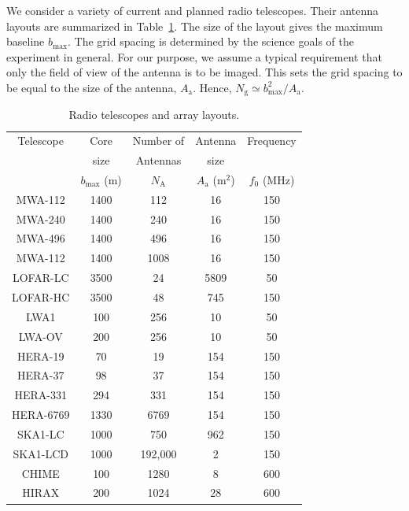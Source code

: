 \documentclass[a4paper,fleqn,usenatbib]{mnras}
\newcommand{\Nant}{N_\textrm{A}}
\newcommand{\Ngrid}{N_\textrm{g}}
\begin{document}
We consider a variety of current and planned radio telescopes. Their antenna layouts are summarized in Table~\ref{tab:antenna-layouts}. The size of the layout gives the maximum baseline $b_\textrm{max}$. The grid spacing is determined by the science goals of the experiment in general. For our purpose, we assume a typical requirement that only the field of view of the antenna is to be imaged. This sets the grid spacing to be equal to the size of the antenna, $A_\textrm{a}$. Hence, $\Ngrid\simeq b_\textrm{max}^2/A_\textrm{a}$. 

\begin{table}
  \scriptsize
  \centering
  \caption{Radio telescopes and array layouts.}
  \label{tab:antenna-layouts}
  \begin{threeparttable}
  \begin{tabular}{ccccc} 
    \hline
    Telescope & Core & Number of & Antenna & Frequency \\
              & size & Antennas & size & \\
              & $b_\textrm{max}$ (m) & $\Nant$ & $A_\textrm{a}$ (m$^2$) & $f_0$ (MHz) \\
    \hline
    MWA-112\tnote{a} & 1400 & 112 & 16 & 150 \\
    MWA-240\tnote{a} & 1400 & 240 & 16 & 150 \\
    MWA-496\tnote{a} & 1400 & 496 & 16 & 150 \\
    MWA-112\tnote{a} & 1400 & 1008 & 16 & 150 \\
    LOFAR-LC\tnote{b} & 3500 & 24 & 5809 & 50 \\
    LOFAR-HC\tnote{b} & 3500 & 48 & 745 & 150 \\
    LWA1 & 100 & 256 & 10 & 50 \\
    LWA-OV\tnote{c} & 200 & 256 & 10 & 50 \\
    HERA-19 & 70 & 19 & 154 & 150 \\
    HERA-37 & 98 & 37 & 154 & 150 \\
    HERA-331 & 294 & 331 & 154 & 150 \\
    HERA-6769\tnote{d} & 1330 & 6769 & 154 & 150 \\
    SKA1-LC\tnote{e} & 1000 & 750 & 962 & 150 \\
    SKA1-LCD\tnote{f} & 1000 & 192,000 & 2 & 150 \\
    CHIME & 100 & 1280 & 8 & 600 \\
    HIRAX\tnote{g} & 200 & 1024 & 28 & 600 \\
    \hline
  \end{tabular}

\end{threeparttable}
\end{table}
\end{document}
